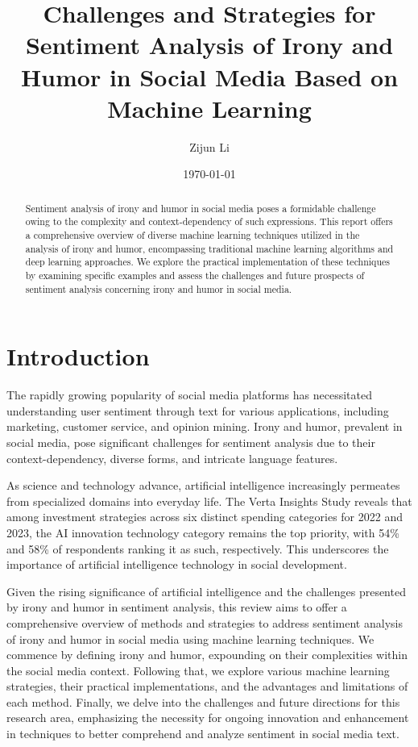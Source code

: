 \documentclass[a4paper]{article}
\title{\textbf{Challenges and Strategies for Sentiment Analysis of Irony and Humor in Social Media Based on Machine Learning}}
\author{Zijun Li}
\date{\today}
\begin{document}
\setlength{\parindent}{2em}

\maketitle
\thispagestyle{empty}

\begin{abstract}
    Sentiment analysis of irony and humor in social media poses a formidable challenge owing to the complexity and context-dependency of such expressions. This report offers a comprehensive overview of diverse machine learning techniques utilized in the analysis of irony and humor, encompassing traditional machine learning algorithms and deep learning approaches. We explore the practical implementation of these techniques by examining specific examples and assess the challenges and future prospects of sentiment analysis concerning irony and humor in social media.
\end{abstract}


\newpage
\setcounter{page}{1}
\section{Introduction}

The rapidly growing popularity of social media platforms has necessitated understanding user sentiment through text for various applications, including marketing, customer service, and opinion mining. Irony and humor, prevalent in social media, pose significant challenges for sentiment analysis due to their context-dependency, diverse forms, and intricate language features.

As science and technology advance, artificial intelligence increasingly permeates from specialized domains into everyday life. The Verta Insights Study reveals that among investment strategies across six distinct spending categories for 2022 and 2023, the AI innovation technology category remains the top priority, with 54\% and 58\% of respondents ranking it as such, respectively. This underscores the importance of artificial intelligence technology in social development.

Given the rising significance of artificial intelligence and the challenges presented by irony and humor in sentiment analysis, this review aims to offer a comprehensive overview of methods and strategies to address sentiment analysis of irony and humor in social media using machine learning techniques. We commence by defining irony and humor, expounding on their complexities within the social media context. Following that, we explore various machine learning strategies, their practical implementations, and the advantages and limitations of each method. Finally, we delve into the challenges and future directions for this research area, emphasizing the necessity for ongoing innovation and enhancement in techniques to better comprehend and analyze sentiment in social media text.
\end{document}
